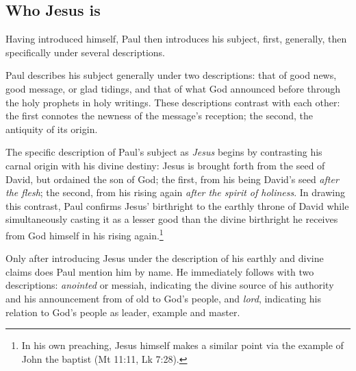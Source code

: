 \subsection{Who Jesus is}
Having introduced himself, Paul then introduces his subject, first, generally, then specifically under several descriptions. 

Paul describes his subject generally under two descriptions: that of good news, good message, or glad tidings, and that of what God announced before through the holy prophets in holy writings. These descriptions contrast with each other: the first connotes the newness of the message's reception; the second, the antiquity of its origin. 

The specific description of Paul's subject as \emph{Jesus} begins by contrasting his carnal origin with his divine destiny: Jesus is brought forth from the seed of David, but ordained the son of God; the first, from his being David's seed \emph{after the flesh}; the second, from his rising again \emph{after the spirit of holiness}. In drawing this contrast, Paul confirms Jesus' birthright to the earthly throne of David while simultaneously casting it as a lesser good than the divine birthright he receives from God himself in his rising again.\footnote{In his own preaching, Jesus himself makes a similar point via the example of John the baptist (Mt 11:11, Lk 7:28).}

Only after introducing Jesus under the description of his earthly and divine claims does Paul mention him by name. He immediately follows with two descriptions: \emph{anointed} or messiah, indicating the divine source of his authority and his announcement from of old to God's people, and \emph{lord}, indicating his relation to God's people as leader, example and master. 


